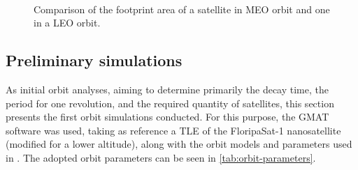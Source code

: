 \begin{figure}[!htb]
    \begin{center}
        ~
        \caption{Comparison of the footprint area of a satellite in MEO orbit and one in a LEO orbit.}
        \label{fig:footprint-comparison}
    \end{center}
\end{figure}

\subsection{Preliminary simulations}

As initial orbit analyses, aiming to determine primarily the decay time, the period for one revolution, and the required quantity of satellites, this section presents the first orbit simulations conducted. For this purpose, the GMAT software was used, taking as reference a TLE of the FloripaSat-1 nanosatellite \cite{marcelino2021} (modified for a lower altitude), along with the orbit models and parameters used in \cite{marino2016}. The adopted orbit parameters can be seen in \autoref{tab:orbit-parameters}.

